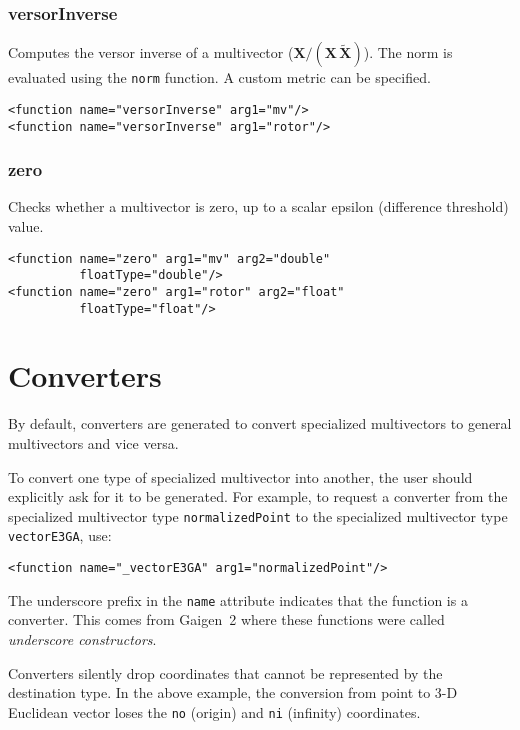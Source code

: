 \documentclass[10pt, a4paper]{article}
\newcommand{\gav}[1]{\ensuremath{\mathbf{#1}}}
\newcommand{\gp}{\,}
\newcommand{\rev}[1]{\widetilde{#1}}
\begin{document}
\subsubsection*{versorInverse}

Computes the versor inverse of a multivector ($\gav{X} / (\gav{X} \gp \rev{\gav{X}})$). 
The norm is evaluated using the {\tt norm} function. A custom metric can be specified.
\begin{verbatim}
<function name="versorInverse" arg1="mv"/>
<function name="versorInverse" arg1="rotor"/>
\end{verbatim}


\subsubsection*{zero}

Checks whether a multivector is zero, up to a scalar epsilon (difference threshold) value.
\begin{verbatim}
<function name="zero" arg1="mv" arg2="double" 
          floatType="double"/>
<function name="zero" arg1="rotor" arg2="float" 
          floatType="float"/>
\end{verbatim}


\section{Converters}
\label{s:converters}

By default, converters are generated to convert specialized multivectors
to general multivectors and vice versa.

To convert one type of specialized multivector into another, the user
should explicitly ask for it to be generated. For example, to request
a converter from the specialized multivector type {\tt normalizedPoint}
to the specialized multivector type {\tt vectorE3GA}, use:
\begin{verbatim}
<function name="_vectorE3GA" arg1="normalizedPoint"/>
\end{verbatim}
The underscore prefix in the {\tt name} attribute indicates that the function 
is a converter. This comes from Gaigen~2 where these functions were called
\emph{underscore constructors}.

Converters silently drop coordinates that cannot be represented by the
destination type. In the above example, the conversion from point to
3-D Euclidean vector loses the {\tt no} (origin) and {\tt ni} (infinity)
coordinates.
\end{document}
